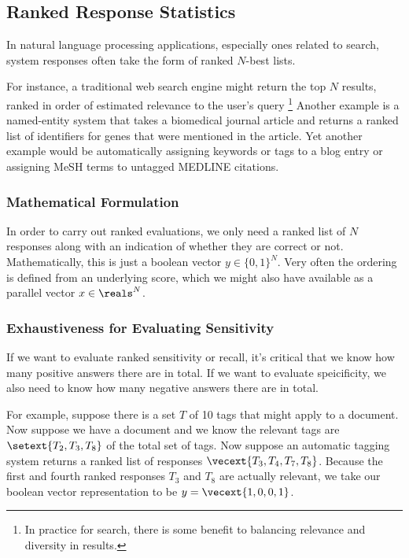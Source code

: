 \subsection{Ranked Response Statistics}

In natural language processing applications, especially ones related
to search, system responses often take the form of ranked $N$-best
lists.  

For instance, a traditional web search engine might return the
top $N$ results, ranked in order of estimated relevance to the user's
query
%
\footnote{In practice for search, there is some benefit to balancing
  relevance and diversity in results.}
%
Another example is a named-entity system that takes a biomedical
journal article and returns a ranked list of identifiers for genes
that were mentioned in the article.  Yet another example would be
automatically assigning keywords or tags to a blog entry or assigning
MeSH terms to untagged MEDLINE citations.

\subsubsection{Mathematical Formulation}

In order to carry out ranked evaluations, we only need a ranked list
of $N$ responses along with an indication of whether they are correct
or not.  Mathematically, this is just a boolean vector $y \in \{ 0, 1
\}^N$.  Very often the ordering is defined from an underlying score,
which we might also have available as a parallel vector $x \in
\reals^N$.

\subsubsection{Exhaustiveness for Evaluating Sensitivity}

If we want to evaluate ranked sensitivity or recall, it's critical
that we know how many positive answers there are in total.  If we want
to evaluate speicificity, we also need to know how many negative
answers there are in total.

For example, suppose there is a set $T$ of 10 tags that might apply to
a document.  Now suppose we have a document and we know the relevant
tags are $\setext{T_2, T_3, T_8}$ of the total set of tags.  Now
suppose an automatic tagging system returns a ranked list of responses
$\vecext{T_3, T_4, T_7, T_8}$.  Because the first and fourth ranked
responses $T_3$ and $T_8$ are actually relevant, we take our boolean
vector representation to be $y = \vecext{1, 0, 0, 1}$.  

